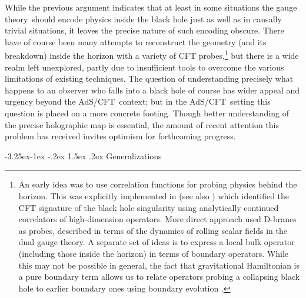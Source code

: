 \documentclass[12pt,a4paper]{article}
\makeatletter
\renewcommand\subsection{\@startsection{subsection}{2}{\z@}%
                                     {-3.25ex\@plus -1ex \@minus -.2ex}%
                                     {1.5ex \@plus .2ex}%
                                     {\normalfont\bfseries}}
\def\AC{AdS/CFT}
\def\GT{gauge theory}
\makeatother
\begin{document}
While the previous argument indicates that at least in some situations the \GT\ should encode physics inside the black hole just as well as in causally trivial situations, it leaves the precise nature of such encoding obscure.  There have of course been many attempts to reconstruct the geometry (and its breakdown) inside the horizon with a variety of CFT probes,\footnote{
An early idea \cite{Balasubramanian:1999zv} was to use correlation functions for probing physics behind the horizon.  This was explicitly implemented in \cite{Fidkowski:2003nf} (see also \cite{Festuccia:2005pi}) which identified the CFT signature of the black hole singularity using analytically continued correlators of high-dimension operators. 
More direct approach  \cite{Horowitz:2009wm} used D-branes as probes, described in terms of the dynamics of rolling scalar fields in the dual \GT.
A separate set of ideas \cite{Hamilton:2006fh} is to express a local bulk operator (including those inside the horizon) in terms of boundary operators.  While this may not be possible in general, the fact that gravitational Hamiltonian is a pure boundary term allows us to relate operators probing a collapsing black hole to earlier boundary ones using boundary evolution \cite{Marolf:2008mf}.
}
but there is a wide realm left unexplored, partly due to insufficient tools to overcome the various limitations of existing techniques.  The question of understanding precisely what happens to an observer who falls into a black hole of course has wider appeal and urgency beyond the \AC\ context; but in the \AC\ setting this question is placed on a more concrete footing.  Though better understanding of the precise holographic map is essential, the amount of recent attention this problem has received invites optimism for forthcoming progress.

\subsection{Generalizations}
\label{s:generalizations}
\end{document}
